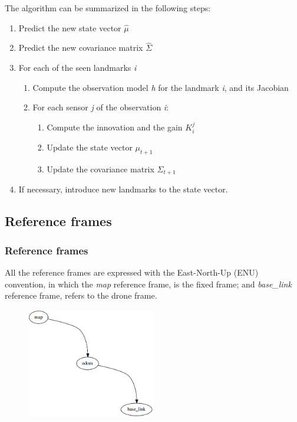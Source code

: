 \documentclass{beamer}
\begin{document}
    \begin{frame}
        \justifying

        The algorithm can be summarized in the following steps:

        \begin{enumerate}
            \item{Predict the new state vector $\hat\mu$}
            \item{Predict the new covariance matrix $\hat\Sigma$}
            \item{For each of the seen landmarks \textit{i}}
            \begin{enumerate}
                \item{Compute the observation model \textit{h} for the landmark \textit{i}, and its Jacobian}
                \item{For each sensor \textit{j} of the observation \textit{i}:}
                \begin{enumerate}
                    \item{Compute the innovation and the gain \textit{$K_i^j$}}
                    \item{Update the state vector $\mu_{t+1}$}
                    \item{Update the covariance matrix $\Sigma_{t+1}$}
                \end{enumerate}
            \end{enumerate}
            \item{If necessary, introduce new landmarks to the state vector.}
        \end{enumerate}

    \end{frame}

    \subsection{Reference frames }
    \begin{frame}
        \justifying
        \frametitle{Reference frames}

       All the reference frames are expressed with the East-North-Up (ENU) convention, in which the \textit{map} reference frame, is the fixed frame; and \textit{base\_link} reference frame, refers to the drone frame.

       \begin{figure}
           \centering
           \includegraphics[width=0.5\textwidth]{frames.png}
       \end{figure}

    \end{frame}
\end{document}

